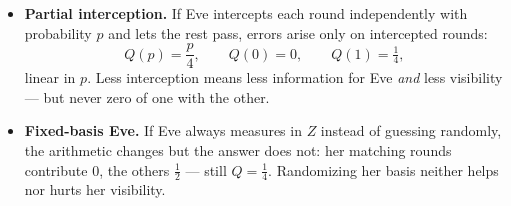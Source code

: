 \documentclass[a4paper,11pt]{article}
\begin{document}
\begin{itemize}
    \item \textbf{Partial interception.} If Eve intercepts each round independently
          with probability $p$ and lets the rest pass, errors arise only on
          intercepted rounds:
          \begin{equation}
              Q(p) = \frac{p}{4}, \qquad Q(0) = 0, \qquad Q(1) = \tfrac{1}{4},
              \label{eq:partial}
          \end{equation}
          linear in $p$. Less interception means less information for Eve \emph{and}
          less visibility --- but never zero of one with the other.
    \item \textbf{Fixed-basis Eve.} If Eve always measures in $Z$ instead of
          guessing randomly, the arithmetic changes but the answer does not: her
          matching rounds contribute $0$, the others $\tfrac{1}{2}$ --- still
          $Q = \tfrac{1}{4}$. Randomizing her basis neither helps nor hurts her
          visibility.
\end{itemize}
\end{document}
